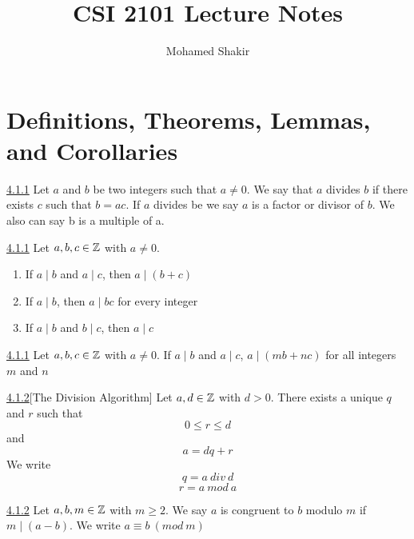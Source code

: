 \documentclass[openany]{report}
\title{CSI 2101 Lecture Notes}
\author{Mohamed Shakir}
\begin{document}
\maketitle

\tableofcontents
\chapter*{Definitions, Theorems, Lemmas, and Corollaries}
\label{chapter:theorems}
\begin{manualdefinition}{\hyperref[definition4.1.1]{4.1.1}}
    Let $a$ and $b$ be two integers such that $a \neq 0$. We say that $a$ divides $b$ if there exists $c$ such that $b = ac$. If $a$ divides be we say $a$ is a factor or divisor of $b$. We also can say b is a multiple of a.

\end{manualdefinition}
\begin{manualtheorem}{\hyperref[theorem4.1.1]{4.1.1}}
    Let $a,b,c \in \mathbb{Z}$ with $a \neq 0$.
    \begin{enumerate}
        \item If $a\mid b$ and $a \mid c$, then $a \mid (b + c)$
        \item If $a \mid b$, then $a \mid bc$ for every integer 
        \item If $a \mid b$ and $b \mid c$, then $a \mid c$
    \end{enumerate}
\end{manualtheorem}
\begin{manualcorollary}{\hyperref[corollary4.1.1]{4.1.1}}
Let $a,b,c \in \mathbb{Z}$ with $a \neq 0$. If $a\mid b$ and $a \mid c$, $a \mid (mb + nc)$ for all integers $m$ and $n$
\end{manualcorollary}
\begin{manualtheorem}{\hyperref[theorem4.1.2]{4.1.2}}[The Division Algorithm]
    Let $a, d \in \mathbb{Z}$ with $d > 0$. There exists a unique $q$ and $r$ such that 
$$0 \leq r \leq d$$
and 
$$a = dq + r$$
We write 
$$q = a \ div \ d$$
$$r=  a \ mod \ a $$
\end{manualtheorem}

\begin{manualdefinition}{\hyperref[definition4.1.2]{4.1.2}}
        Let $a, b, m \in \mathbb{Z}$ with $m \geq 2$. We say $a$ is congruent to $b$ modulo $m$ if $m \mid (a-b)$. We write $a \equiv b \ (mod \ m)$
\end{manualdefinition}
\end{document}

